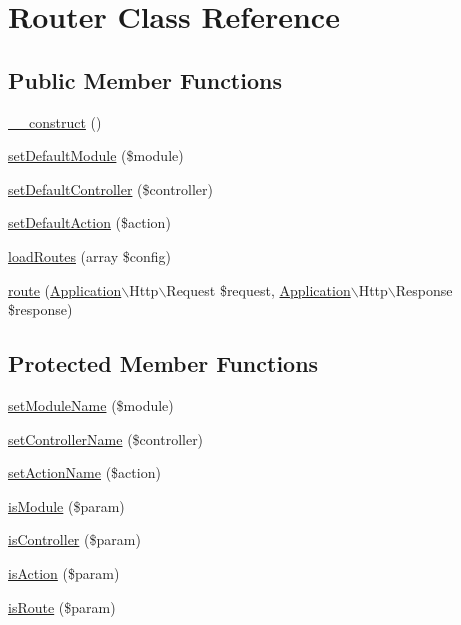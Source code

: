 \hypertarget{class_anemo_1_1_router}{
\section{Router Class Reference}
\label{class_anemo_1_1_router}
}
\subsection*{Public Member Functions}
\begin{DoxyCompactItemize}
\item 
\hyperlink{class_anemo_1_1_router_a095c5d389db211932136b53f25f39685}{\_\-\_\-construct} ()
\item 
\hyperlink{class_anemo_1_1_router_afbdfa605ea27a9d9d5fd6655fc9cb6a0}{setDefaultModule} (\$module)
\item 
\hyperlink{class_anemo_1_1_router_a274600a1cc837f86d4500eab3969e25f}{setDefaultController} (\$controller)
\item 
\hyperlink{class_anemo_1_1_router_ae4281eeaea21283228e29e325b14f76b}{setDefaultAction} (\$action)
\item 
\hyperlink{class_anemo_1_1_router_ac937ff6d29e67889dfd635b740af8c81}{loadRoutes} (array \$config)
\item 
\hyperlink{class_anemo_1_1_router_a0aa151a03b17a17fd98adbf455056d02}{route} (\hyperlink{class_anemo_1_1_application}{Application}$\backslash$Http$\backslash$Request \$request, \hyperlink{class_anemo_1_1_application}{Application}$\backslash$Http$\backslash$Response \$response)
\end{DoxyCompactItemize}
\subsection*{Protected Member Functions}
\begin{DoxyCompactItemize}
\item 
\hyperlink{class_anemo_1_1_router_ace12d039551ac52a70b0629a519fae41}{setModuleName} (\$module)
\item 
\hyperlink{class_anemo_1_1_router_a4e3aa0a1a35106bea24cd0cff17a661e}{setControllerName} (\$controller)
\item 
\hyperlink{class_anemo_1_1_router_a3b9d4e3945e398b30382c80056b5083a}{setActionName} (\$action)
\item 
\hyperlink{class_anemo_1_1_router_a67cc18835787a8cd246840098e8e0497}{isModule} (\$param)
\item 
\hyperlink{class_anemo_1_1_router_aa5b001e7c64faca5595ac6ed1c3a42b4}{isController} (\$param)
\item 
\hyperlink{class_anemo_1_1_router_aea02fd86d072a4d5b78efc8dd437fc4a}{isAction} (\$param)
\item 
\hyperlink{class_anemo_1_1_router_a7f8217042f5433880fa9d00cb6a903ee}{isRoute} (\$param)
\end{DoxyCompactItemize}
